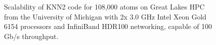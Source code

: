 \begingroup
\begin{figure}[!ht]
  \centering
\caption[Scalability of KNN2 code on Great Lakes HPC.]{Scalability of KNN2 code for 108,000 atoms on Great Lakes HPC from the University of Michigan with 2x 3.0 GHz Intel Xeon Gold 6154 processors and InfiniBand HDR100 networking, capable of 100 Gb/s throughput.}
\label{Chap:Al/Vac:fig:scale}
\end{figure}
\endgroup

